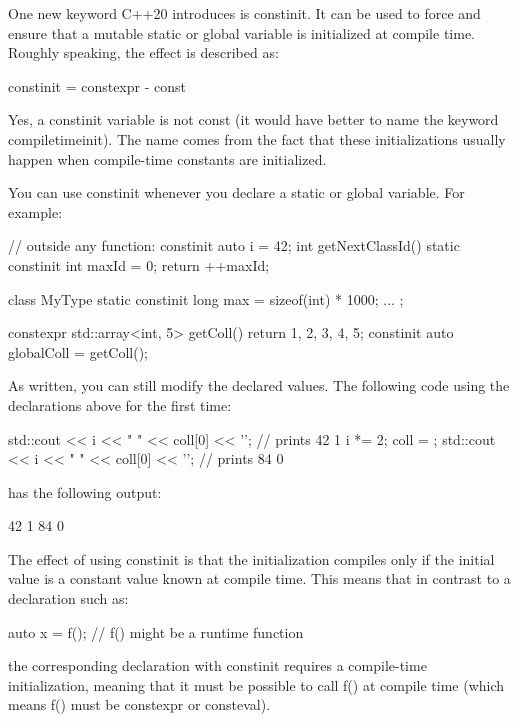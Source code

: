 
One new keyword C++20 introduces is constinit. It can be used to force and ensure that a mutable static or global variable is initialized at compile time. Roughly speaking, the effect is described as:

\begin{cpp}
constinit = constexpr - const
\end{cpp}

Yes, a constinit variable is not const (it would have better to name the keyword compiletimeinit). The name comes from the fact that these initializations usually happen when compile-time constants are initialized.

You can use constinit whenever you declare a static or global variable. For example:

\begin{cpp}
// outside any function:
constinit auto i = 42;
int getNextClassId() {
	static constinit int maxId = 0;
	return ++maxId;
}

class MyType {
	static constinit long max = sizeof(int) * 1000;
	...
};

constexpr std::array<int, 5> getColl() {
	return {1, 2, 3, 4, 5};
}
constinit auto globalColl = getColl();
\end{cpp}

As written, you can still modify the declared values. The following code using the declarations above for the first time:

\begin{cpp}
std::cout << i << " " << coll[0] << '\n'; // prints 42 1
i *= 2;
coll = {};
std::cout << i << " " << coll[0] << '\n'; // prints 84 0
\end{cpp}

has the following output:

\begin{shell}
42 1
84 0
\end{shell}

The effect of using constinit is that the initialization compiles only if the initial value is a constant value known at compile time. This means that in contrast to a declaration such as:

\begin{cpp}
auto x = f(); // f() might be a runtime function
\end{cpp}

the corresponding declaration with constinit requires a compile-time initialization, meaning that it must be possible to call f() at compile time (which means f() must be constexpr or consteval).

